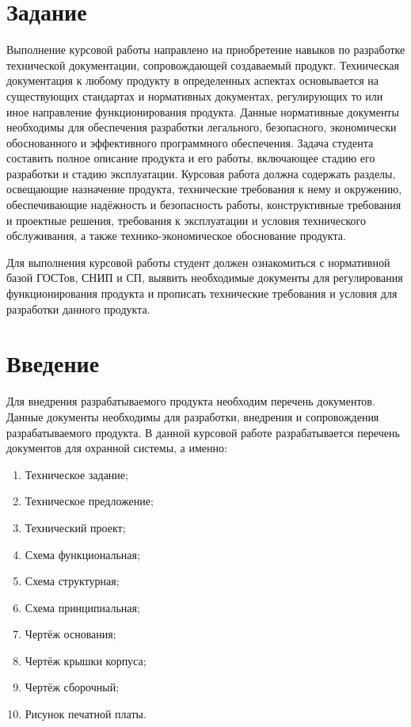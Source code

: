 \chapter*{Задание}
Выполнение курсовой работы направлено на приобретение навыков по разработке технической документации, сопровождающей создаваемый продукт. 
Техническая документация к любому продукту в определенных аспектах основывается на существующих стандартах и нормативных документах, регулирующих то или иное направление функционирования продукта. 
Данные нормативные документы необходимы для обеспечения разработки легального, безопасного, экономически обоснованного и эффективного программного обеспечения. Задача студента составить полное описание продукта и его работы, включающее стадию его разработки и стадию эксплуатации. Курсовая работа должна содержать разделы, освещающие назначение продукта, технические требования к нему и окружению, обеспечивающие надёжность и безопасность работы, конструктивные требования и проектные решения, требования к эксплуатации и условия технического обслуживания, а также технико-экономическое обоснование продукта. 

Для выполнения курсовой работы студент должен ознакомиться с нормативной базой ГОСТов, СНИП и СП, выявить необходимые документы для регулирования функционирования продукта и прописать технические требования и условия для разработки данного продукта.

\chapter*{Введение}
Для внедрения разрабатываемого продукта необходим перечень документов.
Данные документы необходимы для разработки, внедрения и сопровождения разрабатываемого продукта.
В данной курсовой работе разрабатывается перечень документов для охранной системы, а именно:
\begin{enumerate}
\changefontsizes[14pt]{14pt}
	\item Техническое задание;
	\item Техническое предложение;
	\item Технический проект;
	\item Схема функциональная;
	\item Схема структурная;
	\item Схема принципиальная;
	\item Чертёж основания;
	\item Чертёж крышки корпуса;
	\item Чертёж сборочный;
	\item Рисунок печатной платы.
\end{enumerate}

